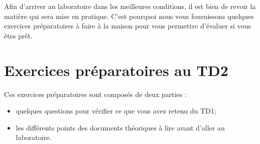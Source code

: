 \documentclass[a4paper,11pt]{article}
\date{2018 -- 2019}
\begin{document}
\entete
\titre
{}
\lastedit


	\begin{tcolorbox}[blanker,
	before skip=10mm,after skip=10mm,
	borderline west={1mm}{-4mm}{lightgray},
	title=Consignes, coltitle=black, fonttitle=\sffamily\bfseries\large]
	Afin d'arriver au laboratoire dans les meilleures conditions,
	il est bien de revoir la mati\`ere qui sera mise en pratique.
	C'est pourquoi nous vous fournissons quelques exercices
	pr\'eparatoires \`a faire \`a la maison pour vous permettre
	d'\'evaluer si vous \^etes pr\^et.
	\end{tcolorbox}
	
	\tableofcontents

	\newpage

\section{Exercices pr\'eparatoires au TD2}

Ces exercices pr\'eparatoires sont compos\'es de deux parties :

\par

\begin{itemize}
	
	\item quelques questions pour v\'erifier ce que vous avez retenu du TD1;
	\item les diff\'erents points des documents th\'eoriques \`a lire avant d'aller au laboratoire.
\end{itemize}

\end{document}
